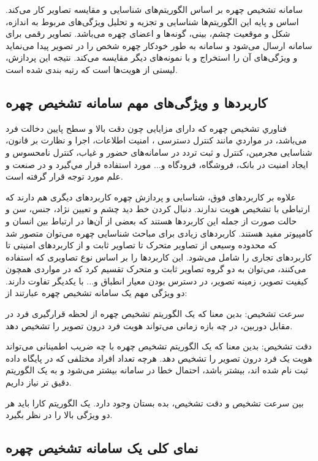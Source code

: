 سامانه تشخیص چهره بر اساس الگوریتم‌های شناسایی و مقایسه تصاویر کار می‌کند. اساس و پایه این الگوریتم‌ها شناسایی و تجزیه و تحلیل ویژگی‌های مربوط به اندازه، شکل و موقعیت چشم، بینی، گونه‌ها و اعضای چهره می‌باشد. تصاویر رقمی برای سامانه ارسال می‌شود و سامانه به طور خودکار چهره شخص را در تصویر پیدا می‌نماید و ویژگی‌های آن را استخراج و با نمونه‌های دیگر مقایسه می‌کند. نتیجه این پردازش، لیستی از هویت‌ها است که رتبه بندی شده است.

\subsection{کاربردها و ویژگی‌های مهم سامانه تشخیص چهره}

فناوري تشخیص چهره که دارای مزايايی چون دقت بالا و سطح پايين دخالت فرد می‌باشد، در مواردي مانند کنترل دسترسی ، امنيت اطلاعات، اجرا و نظارت بر قانون، شناسایی مجرمین، کنترل و ثبت تردد در سامانه‌های حضور و غیاب، کنترل نامحسوس و ایجاد امنیت در بانک، فروشگاه، فرودگاه و... مورد استفاده قرار مي‌گيرد و در صنعت و علم مورد توجه قرار گرفته است.

\noindent
علاوه بر کاربردهای فوق، شناسایی و پردازش چهره کاربردهای دیگری هم دارند که ارتباطی با تشخیص هویت ندارند. دنبال کردن خط دید چشم و تعیین نژاد، جنس، سن و حالت صورت از جمله این کاربردها هستند که بعضی از آن‌ها در ارتباط بین انسان و کامپیوتر مفید هستند. کاربردهای زیادی برای مباحث شناسایی چهره می‌توان متصور شد که محدوده وسیعی از تصاویر متحرک تا تصاویر ثابت و از کاربردهای امنیتی تا کاربردهای تجاری را شامل می‌شود. این کاربردها را بر اساس نوع تصاویری که استفاده می‌کنند، می‌توان به دو گروه تصاویر ثابت و متحرک تقسیم کرد که در مواردی همچون کیفیت تصویر، زمینه تصویر، در دسترس بودن معیار انطباق و... با یکدیگر تفاوت دارند. دو ویژگی مهم یک سامانه تشخیص چهره عبارتند از:

\noindent
سرعت تشخیص: بدین معنا که یک الگوریتم تشخیص چهره از لحظه قرارگیری فرد در مقابل دوربین، در چه بازه زمانی می‌تواند هویت فرد درون تصویر را تشخیص دهد.

\noindent
دقت تشخیص: بدین معنا که یک الگوریتم تشخیص چهره با چه ضریب اطمینانی می‌تواند هویت یک فرد درون تصویر را تشخیص دهد. هرچه تعداد افراد مختلفی که در پایگاه داده ثبت نام شده اند، بیشتر باشد، احتمال خطا در سامانه بیشتر می‌شود و به یک الگوریتم دقیق تر نیاز داریم.

\noindent
بین سرعت تشخیص و دقت تشخیص، بده بستان  وجود دارد. یک الگوریتم کارا باید هر دو ویژگی بالا را در نظر بگیرد.

\subsection{نمای کلی یک سامانه تشخیص چهره}

